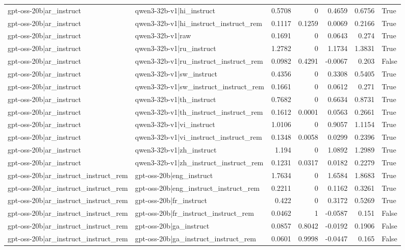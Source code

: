 \begin{table}
\begin{tabular}{l l r r r r l}
gpt-oss-20b|ar_instruct & qwen3-32b-v1|hi_instruct & 0.5708 & 0 & 0.4659 & 0.6756 & True \\
gpt-oss-20b|ar_instruct & qwen3-32b-v1|hi_instruct_instruct_rem & 0.1117 & 0.1259 & 0.0069 & 0.2166 & True \\
gpt-oss-20b|ar_instruct & qwen3-32b-v1|raw & 0.1691 & 0 & 0.0643 & 0.274 & True \\
gpt-oss-20b|ar_instruct & qwen3-32b-v1|ru_instruct & 1.2782 & 0 & 1.1734 & 1.3831 & True \\
gpt-oss-20b|ar_instruct & qwen3-32b-v1|ru_instruct_instruct_rem & 0.0982 & 0.4291 & -0.0067 & 0.203 & False \\
gpt-oss-20b|ar_instruct & qwen3-32b-v1|sw_instruct & 0.4356 & 0 & 0.3308 & 0.5405 & True \\
gpt-oss-20b|ar_instruct & qwen3-32b-v1|sw_instruct_instruct_rem & 0.1661 & 0 & 0.0612 & 0.271 & True \\
gpt-oss-20b|ar_instruct & qwen3-32b-v1|th_instruct & 0.7682 & 0 & 0.6634 & 0.8731 & True \\
gpt-oss-20b|ar_instruct & qwen3-32b-v1|th_instruct_instruct_rem & 0.1612 & 0.0001 & 0.0563 & 0.2661 & True \\
gpt-oss-20b|ar_instruct & qwen3-32b-v1|vi_instruct & 1.0106 & 0 & 0.9057 & 1.1154 & True \\
gpt-oss-20b|ar_instruct & qwen3-32b-v1|vi_instruct_instruct_rem & 0.1348 & 0.0058 & 0.0299 & 0.2396 & True \\
gpt-oss-20b|ar_instruct & qwen3-32b-v1|zh_instruct & 1.194 & 0 & 1.0892 & 1.2989 & True \\
gpt-oss-20b|ar_instruct & qwen3-32b-v1|zh_instruct_instruct_rem & 0.1231 & 0.0317 & 0.0182 & 0.2279 & True \\
gpt-oss-20b|ar_instruct_instruct_rem & gpt-oss-20b|eng_instruct & 1.7634 & 0 & 1.6584 & 1.8683 & True \\
gpt-oss-20b|ar_instruct_instruct_rem & gpt-oss-20b|eng_instruct_instruct_rem & 0.2211 & 0 & 0.1162 & 0.3261 & True \\
gpt-oss-20b|ar_instruct_instruct_rem & gpt-oss-20b|fr_instruct & 0.422 & 0 & 0.3172 & 0.5269 & True \\
gpt-oss-20b|ar_instruct_instruct_rem & gpt-oss-20b|fr_instruct_instruct_rem & 0.0462 & 1 & -0.0587 & 0.151 & False \\
gpt-oss-20b|ar_instruct_instruct_rem & gpt-oss-20b|ga_instruct & 0.0857 & 0.8042 & -0.0192 & 0.1906 & False \\
gpt-oss-20b|ar_instruct_instruct_rem & gpt-oss-20b|ga_instruct_instruct_rem & 0.0601 & 0.9998 & -0.0447 & 0.165 & False \\

\end{tabular}
\end{table}
